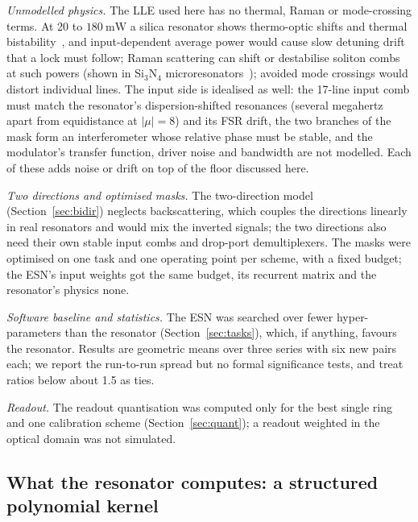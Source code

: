\emph{Unmodelled physics.} The LLE used here has no thermal, Raman or mode-crossing terms. At 20 to $180~\mathrm{mW}$ a silica resonator
shows thermo-optic shifts and thermal bistability~\cite{carmon2004}, and input-dependent average power would cause slow detuning drift
that a lock must follow; Raman scattering can shift or destabilise soliton combs at such powers (shown in Si$_3$N$_4$
microresonators~\cite{karpov2016}); avoided mode
crossings would distort individual lines. The input side is idealised as well: the 17-line input comb must match the resonator's
dispersion-shifted resonances (several megahertz apart from equidistance at $|\mu|=8$) and its FSR drift, the two branches of the
mask form an interferometer whose relative phase must be stable, and the modulator's transfer function, driver noise and bandwidth are
not modelled. Each of these adds noise or drift on top of the floor discussed here.

\emph{Two directions and optimised masks.} The two-direction model (Section~\ref{sec:bidir}) neglects backscattering, which couples
the directions linearly in real resonators and would mix the inverted signals; the two directions also need their own stable input
combs and drop-port demultiplexers. The masks were optimised on one task and one operating point per scheme, with a fixed budget;
the ESN's input weights got the same budget, its recurrent matrix and the resonator's physics none.

\emph{Software baseline and statistics.} The ESN was searched over fewer hyper-parameters than the resonator (Section~\ref{sec:tasks}),
which, if anything, favours the resonator. Results are geometric means over three series with six new pairs each; we report the
run-to-run spread but no formal significance tests, and treat ratios below about 1.5 as ties.

\emph{Readout.} The readout quantisation was computed only for the best single ring and one calibration scheme
(Section~\ref{sec:quant}); a readout weighted in the optical domain was not simulated.

\subsection{What the resonator computes: a structured polynomial kernel}\label{sec:kernel}

